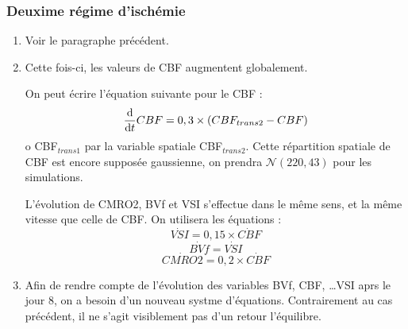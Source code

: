 \subsubsection{Deuxime r\'egime d'isch\'emie}

\begin{enumerate}[label=\textbf{(L\'esion 2 - \arabic*)}]
\item Voir le paragraphe pr\'ec\'edent.
\item Cette fois-ci, les valeurs de CBF augmentent globalement. %

On peut \'ecrire l'\'equation suivante pour le CBF :
\begin{equation}
\der{CBF}=0,3\times \left(CBF_{trans2}-CBF\right)%
\label{cbf_is2}
\end{equation}
o CBF${}_{trans1}$ par la variable spatiale CBF${}_{trans2}$. %
Cette r\'epartition spatiale de CBF est encore suppos\'ee gaussienne, on prendra $\mathcal{N}(220,43)$ pour les simulations.

\par
L'\'evolution de CMRO2, BVf et VSI s'effectue dans le m\^eme sens, et  la m\^eme vitesse que celle de CBF. On utilisera les \'equations :
\begin{equation}
\dot{VSI}=0,15\times\dot{CBF}
\label{vsi_is2_tr}
\end{equation}
\begin{equation}
\dot{BVf}=\dot{VSI}
\label{bvf_is2_tr}
\end{equation}
\begin{equation}
\dot{CMRO2}=0,2\times\dot{CBF}
\label{cmro2_is2_tr}
\end{equation}
\item %
%
Afin de rendre compte de l'\'evolution des variables BVf, CBF, \dots VSI aprs le jour 8, on a besoin d'un nouveau systme d'\'equations. %
Contrairement au cas pr\'ec\'edent, il ne s'agit visiblement pas d'un retour  l'\'equilibre.


\end{enumerate}

